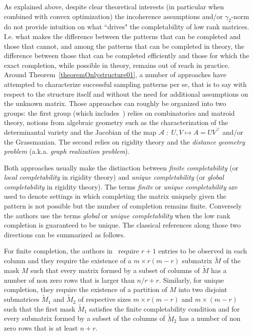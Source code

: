 \documentclass[12pt]{article}
\begin{document}
As explained above, despite clear theoretical interests (in particular when combined with convex optimization) the incoherence assumptions and/or $\gamma_2$-norm do not provide intuition on what ``drives" the completability of low rank matrices.  I.e. what makes the difference between the patterns that can be completed and those that cannot,  and among the patterns that can be completed in theory, the difference between those that can be completed efficiently and those for which the exact completion, while possible in theory, remains out of reach in practice.  
Around Theorem~\ref{theoremOnlystructure01}, a number of approaches have attempted to characterize successful sampling patterns per se,  that is to say with respect to the structure itself and without the need for additional assumptions on the unknown matrix. Those approaches can roughly be organized into two groups: the first group (which includes~\cite{kiraly2015algebraic}) relies on combinatorics and matroid theory, notions from algebraic geometry such as the characterization of the determinantal variety and the Jacobian of the map $\mathcal{A}\;:\; U,V\mapsto A = UV^\intercal$ and/or the Grassmanian. The second relies on rigidity theory and the \emph{distance geometry problem} (a.k.a. \emph{graph realization problem}). 

Both approaches usually make the distinction between \emph{finite completability} (or \emph{local completability} in rigidity theory) and \emph{unique completability} (or \emph{global completability} in rigidity theory).  The terms \emph{finite} or \emph{unique completability} are used to denote settings in which completing the matrix uniquely given the pattern is not possible but the number of completion remains finite.  Conversely the authors use the terms \emph{global} or \emph{unique completability} when the low rank completion is guaranteed to be unique.  The classical references along those two directions can be summarized as follows. 

For finite completion, the authors in~\cite{pimentel2016characterization} require $r+1$ entries to be observed in each column and they require the existence of a $m\times r(m-r)$ submatrix $\tilde{M}$ of the mask $M$ such that every matrix formed by a subset of columns of $\tilde{M}$ has a number of non zero rows that is larger than $n/r + r$.  Similarly, for unique completion,  they require the existence of a partition of $M$ into two disjoint submatrices $\tilde{M}_1$ and $\tilde{M}_2$ of respective sizes $m\times r(m-r)$ and $m\times (m-r)$ such that the first mask $\tilde{M}_1$ satisfies the finite completability condition and for every submatrix formed by a subset of the columns of $\tilde{M}_2$ has a number of non zero rows that is at least $n+r$.   
\end{document}
